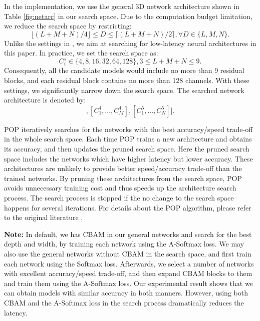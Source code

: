 \documentclass[final,5p,times,twocolumn]{elsarticle}
\begin{document}
In the implementation, we use the general 3D network architecture shown in Table \ref{fig:netarc} in our search space. 
Due to the computation budget limitation, we reduce the search space by restricting:
\begin{equation}
\label{eq:space}
\lfloor(L+M+N)/4\rfloor \leq D \leq \lceil (L+M+N)/2 \rceil, \forall D \in \{L, M, N\}.
\end{equation} 
Unlike the settings in \citep{li2019partial}, we aim at searching for low-latency neural architectures in this paper. In practice, we set the search space as: 
\begin{equation}
C_i^s \in \{4, 8, 16, 32, 64, 128\}, 3\leq L+M+N\leq 9.
\end{equation}
Consequently, all the candidate models would include no more than 9 residual blocks, and each residual block contains no more than 128 channels. With these settings, we significantly narrow down the search space. 
The searched network architecture is denoted by:
\begin{equation}
[[C^3_1, ..., C^3_L], [C^4_1, ..., C^4_M], [C^5_1, ..., C^5_N]].
\label{eq:netarc}
\end{equation}


POP iteratively searches for the networks with the best accuracy/speed trade-off in the whole search space. Each time POP trains a new architecture and obtains its accuracy, and then updates the pruned search space. Here the pruned search space includes the networks which have higher latency but lower accuracy. These architectures are unlikely to provide better speed/accuracy trade-off than the trained networks. By pruning these architectures from the search space, POP avoids unnecessary training cost and thus speeds up the architecture search process. The search process is stopped if the no change to the search space happens for several iterations. For details about the POP algorithm, please refer to the original literature \citep{li2019partial}. 

\textbf{Note:} In default, we has CBAM in our general networks and search for the best depth and width, by training each network using the A-Softmax loss. We may also use the general networks without CBAM in the search space, and first train each network using the Softmax loss. Afterwards, we select a number of networks with excellent  accuracy/speed trade-off, and then expand CBAM blocks to them and train them using the A-Softmax loss. Our experimental result shows that we can obtain models with similar accuracy in both manners. However, using both CBAM and the A-Softmax loss in the search process dramatically reduces the latency.  
\end{document}
